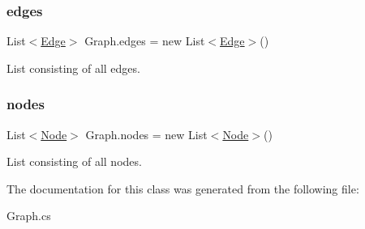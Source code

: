 \subsubsection{\texorpdfstring{edges}{edges}}
{\footnotesize\ttfamily List$<$\mbox{\hyperlink{class_edge}{Edge}}$>$ Graph.\+edges = new List$<$\mbox{\hyperlink{class_edge}{Edge}}$>$()}



List consisting of all edges. 

\mbox{\label{class_graph_a5ecc9c1538b1c81f615e5cfd12f29816}} 
\subsubsection{\texorpdfstring{nodes}{nodes}}
{\footnotesize\ttfamily List$<$\mbox{\hyperlink{class_node}{Node}}$>$ Graph.\+nodes = new List$<$\mbox{\hyperlink{class_node}{Node}}$>$()}



List consisting of all nodes. 



The documentation for this class was generated from the following file\+:\begin{DoxyCompactItemize}
\item 
Graph.\+cs\end{DoxyCompactItemize}
